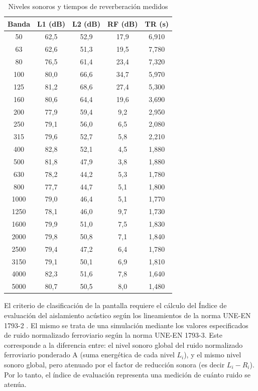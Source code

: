 \begin{table}[H]
\setlength\arrayrulewidth{1pt}
    \centering
    \begin{tabular}{|c|c|c|c|c|} \hline
        \textbf{Banda} & \textbf{L1 (dB)} & \textbf{L2 (dB)} & \textbf{RF (dB)} & \textbf{TR (s)} \\ \hline \hline
        50& 62,5&	52,9&	17,9&	6,910 \\ \hline
        63& 62,6&	51,3&	19,5&	7,780 \\ \hline
        80& 76,5&	61,4&	23,4&	7,320 \\ \hline
        100& 80,0&	66,6&	34,7&	5,970 \\ \hline
        125& 81,2&  68,6&	27,4&	5,300 \\ \hline
        160& 80,6&	64,4&	19,6&	3,690\\ \hline
        200& 77,9&	59,4&	9,2 &	2,950 \\ \hline
        250& 79,1&	56,0&	6,5 &	2,080\\ \hline
        315& 79,6&	52,7&	5,8 &	2,210 \\ \hline
        400& 82,8&	52,1&	4,5 &	1,880 \\ \hline
        500& 81,8&	47,9&	3,8 &	1,880 \\ \hline
        630& 78,2&	44,2&	5,3 &	1,780 \\ \hline
        800& 77,7&	44,7&	5,1 &	1,800 \\ \hline
        1000& 79,0&	46,4&	5,1 &	1,770 \\ \hline
        1250& 78,1&	46,0&	9,7 &	1,730 \\ \hline
        1600& 79,9&	51,0&	7,5 &	1,830 \\ \hline
        2000& 79,8&	50,8&	7,1 &	1,840 \\ \hline
        2500& 79,4&	47,2&	6,4 &	1,780 \\ \hline
        3150& 79,1&	50,1&	6,9 &	1,810 \\ \hline
        4000& 82,3&	51,6&	7,8 &	1,640 \\ \hline
        5000& 80,7&	50,5&	8,0 &	1,480\\ \hline
    \end{tabular}
    \caption{Niveles sonoros y tiempos de reverberación medidos}
    \label{tab:Niveles_sonoros_y_tiempos_de_reverberacion_medidos}
\end{table}

\par El criterio de clasificación de la pantalla requiere el cálculo del Índice de evaluación del aislamiento acústico según los lineamientos de la norma UNE-EN 1793-2 . El mismo se trata de una simulación mediante los valores especificados de ruido normalizado ferroviario según la norma UNE-EN 1793-3. Este corresponde a la diferencia entre: el nivel sonoro global del ruido normalizado ferroviario ponderado A (suma energética de cada nivel $L_i$), y el mismo nivel sonoro global, pero atenuado por el factor de reducción sonora (es decir $L_i - R_i$). Por lo tanto, el índice de evaluación representa una medición de cuánto ruido se atenúa.

